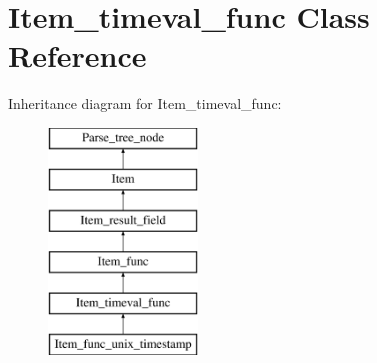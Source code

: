 \hypertarget{classItem__timeval__func}{}\section{Item\+\_\+timeval\+\_\+func Class Reference}
\label{classItem__timeval__func}
Inheritance diagram for Item\+\_\+timeval\+\_\+func\+:\begin{figure}[H]
\begin{center}
\leavevmode
\includegraphics[height=6.000000cm]{classItem__timeval__func}
\end{center}
\end{figure}
